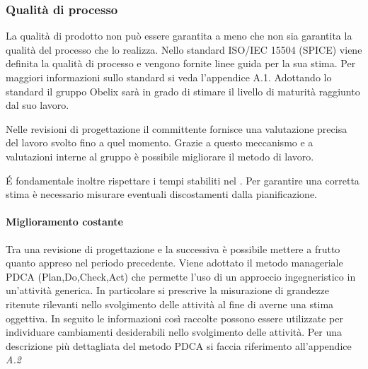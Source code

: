 \subsubsection{Qualità di processo}

La qualità di prodotto non può essere garantita a meno che non sia
garantita la qualità del processo che lo realizza. Nello standard
ISO/IEC 15504 (SPICE) viene definita la qualità di processo e vengono
fornite linee guida per la sua stima. Per maggiori informazioni sullo
standard si veda l'appendice A.1.
Adottando lo standard il gruppo Obelix sarà in grado di stimare
il livello di maturità raggiunto dal suo lavoro.

Nelle revisioni di progettazione il committente
fornisce una valutazione precisa del lavoro svolto fino a quel
momento.
Grazie a questo meccanismo e a valutazioni interne al gruppo è
possibile migliorare il metodo di lavoro.

\'E fondamentale inoltre rispettare i tempi stabiliti nel \pianodiprogetto. Per garantire una corretta stima è necessario misurare
eventuali discostamenti dalla pianificazione.

\paragraph{Miglioramento costante}

Tra una revisione di progettazione e la successiva è possibile
mettere a frutto quanto appreso nel periodo precedente.
Viene adottato il metodo manageriale PDCA (Plan,Do,Check,Act) che
permette l'uso di un approccio ingegneristico in un'attività generica.
In particolare si prescrive la misurazione di grandezze ritenute
rilevanti nello svolgimento delle attività al fine di averne una stima
oggettiva.
In seguito le informazioni così raccolte possono essere utilizzate per
individuare cambiamenti desiderabili nello svolgimento delle attività.
Per una descrizione più dettagliata del metodo PDCA si faccia
riferimento all'appendice \emph{A.2}


